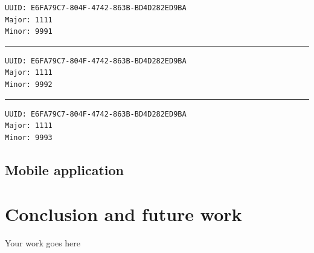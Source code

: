 \documentclass[12pt]{article}
\begin{document}
\begin{lstlisting}
UUID: E6FA79C7-804F-4742-863B-BD4D282ED9BA
Major: 1111
Minor: 9991
\end{lstlisting}

\noindent\rule{13cm}{0.4pt}

\begin{lstlisting}
UUID: E6FA79C7-804F-4742-863B-BD4D282ED9BA
Major: 1111
Minor: 9992
\end{lstlisting}

\noindent\rule{13cm}{0.4pt}

\begin{lstlisting}
UUID: E6FA79C7-804F-4742-863B-BD4D282ED9BA
Major: 1111
Minor: 9993
\end{lstlisting}

\subsection{Mobile application}

\section{Conclusion and future work}
\label{sect-conclusion}
Your work goes here

\cleardoublepage
{}


\end{document}
